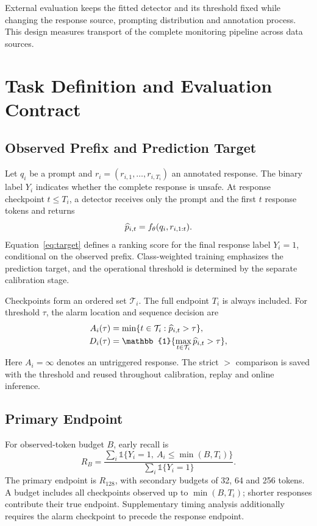 External evaluation keeps the fitted detector and its threshold fixed while changing the response source, prompting distribution and annotation process. This design measures transport of the complete monitoring pipeline across data sources.

\section{Task Definition and Evaluation Contract}
\subsection{Observed Prefix and Prediction Target}
Let $q_i$ be a prompt and $r_i=(r_{i,1},\ldots,r_{i,T_i})$ an annotated response. The binary label $Y_i$ indicates whether the complete response is unsafe. At response checkpoint $t\leq T_i$, a detector receives only the prompt and the first $t$ response tokens and returns
\begin{equation}
 \widehat p_{i,t}=f_\theta(q_i,r_{i,1:t}).
 \label{eq:target}
\end{equation}
Equation~\ref{eq:target} defines a ranking score for the final response label $Y_i=1$, conditional on the observed prefix. Class-weighted training emphasizes the prediction target, and the operational threshold is determined by the separate calibration stage.

Checkpoints form an ordered set $\mathcal T_i$. The full endpoint $T_i$ is always included. For threshold $\tau$, the alarm location and sequence decision are
\begin{align*}
 A_i(\tau)&=\min\{t\in\mathcal T_i:\risk_{i,t}>\tau\},\\
 D_i(\tau)&=\mathbb{1}\{\max_{t\in\mathcal T_i}\risk_{i,t}>\tau\},
\end{align*}
Here $A_i=\infty$ denotes an untriggered response. The strict $>$ comparison is saved with the threshold and reused throughout calibration, replay and online inference.

\subsection{Primary Endpoint}
For observed-token budget $B$, early recall is
\begin{equation}
 R_B=\frac{\sum_i\mathbb{1}\{Y_i=1,\ A_i\leq\min(B,T_i)\}}
 {\sum_i\mathbb{1}\{Y_i=1\}}.
 \label{eq:recall}
\end{equation}
The primary endpoint is $R_{128}$, with secondary budgets of 32, 64 and 256 tokens. A budget includes all checkpoints observed up to $\min(B,T_i)$; shorter responses contribute their true endpoint. Supplementary timing analysis additionally requires the alarm checkpoint to precede the response endpoint.

